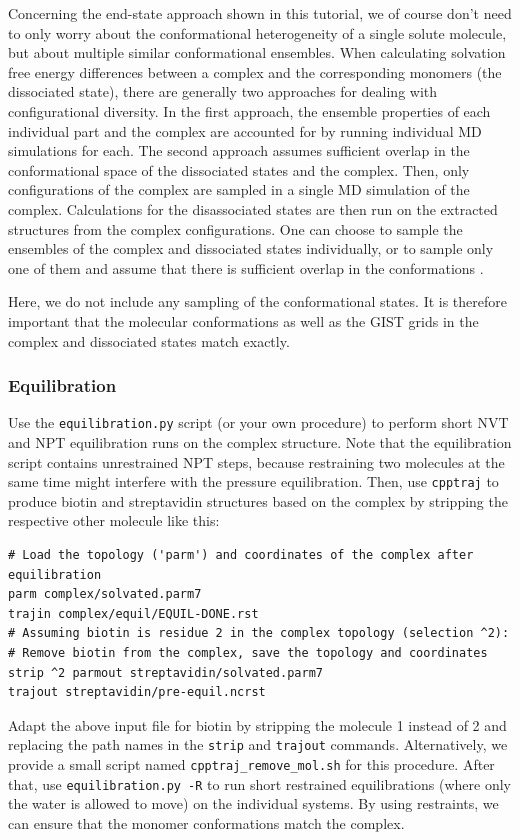 \documentclass[9pt,tutorial]{livecoms}
\newcommand{\software}{\texttt}
\newcommand\inlinecode{\texttt}
\begin{document}
Concerning the end-state approach shown in this tutorial, we of course don't need to only worry about the conformational heterogeneity of a single solute molecule, but about multiple similar conformational ensembles.
When calculating solvation free energy differences between a complex and the corresponding monomers (the dissociated state), there are generally two approaches for dealing with configurational diversity. 
In the first approach, the ensemble properties of each individual part and the complex are accounted for by running individual MD simulations for each.
The second approach assumes sufficient overlap in the conformational space of the dissociated states and the complex. 
Then, only configurations of the complex are sampled in a single MD simulation of the complex. 
Calculations for the disassociated states are then run on the extracted structures from the complex configurations.
One can choose to sample the ensembles of the complex and dissociated states individually, or to sample only one of them and assume that there is sufficient overlap in the conformations \cite{Genheden-EndState2012,Wang-MMPBSA2019}. 

Here, we do not include any sampling of the conformational states.
It is therefore important that the molecular conformations as well as the GIST grids in the complex and dissociated states match exactly.
\subsubsection{Equilibration}
Use the \software{equilibration.py} script (or your own procedure) to perform short NVT and NPT equilibration runs on the complex structure.
Note that the equilibration script contains unrestrained NPT steps, because restraining two molecules at the same time might interfere with the pressure equilibration.
Then, use \software{cpptraj} to produce biotin and streptavidin structures based on the complex by stripping the respective other molecule like this:
\begin{lstlisting}[style=cpptraj]
# Load the topology ('parm') and coordinates of the complex after equilibration
parm complex/solvated.parm7
trajin complex/equil/EQUIL-DONE.rst
# Assuming biotin is residue 2 in the complex topology (selection ^2):
# Remove biotin from the complex, save the topology and coordinates
strip ^2 parmout streptavidin/solvated.parm7
trajout streptavidin/pre-equil.ncrst
\end{lstlisting}
Adapt the above input file for biotin by stripping the molecule 1 instead of 2 and replacing the path names in the \inlinecode{strip} and  \inlinecode{trajout} commands.
Alternatively, we provide a small script named \software{cpptraj\_remove\_mol.sh} for this procedure.
After that, use \software{equilibration.py -R} to run short restrained 
equilibrations (where only the water is allowed to move) on the individual 
systems.
By using restraints, we can ensure that the monomer conformations match the complex.
\end{document}
